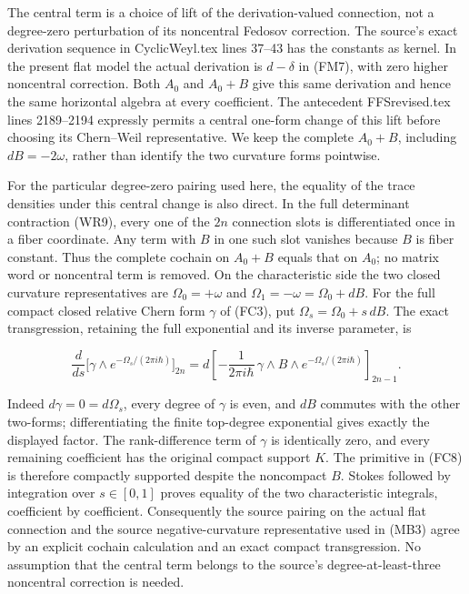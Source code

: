 \documentclass[
  11pt,
]{article}
\begin{document}
The central term is a choice of lift of the derivation-valued
connection, not a degree-zero perturbation of its noncentral Fedosov
correction. The source's exact derivation sequence in CyclicWeyl.tex
lines 37--43 has the constants as kernel. In the present flat model the
actual derivation is \(d-\delta\) in (FM7), with zero higher noncentral
correction. Both \(A_0\) and \(A_0+B\) give this same derivation and
hence the same horizontal algebra at every coefficient. The antecedent
FFSrevised.tex lines 2189--2194 expressly permits a central one-form
change of this lift before choosing its Chern--Weil representative. We
keep the complete \(A_0+B\), including \(dB=-2\omega\), rather than
identify the two curvature forms pointwise.

For the particular degree-zero pairing used here, the equality of the
trace densities under this central change is also direct. In the full
determinant contraction (WR9), every one of the \(2n\) connection slots
is differentiated once in a fiber coordinate. Any term with \(B\) in one
such slot vanishes because \(B\) is fiber constant. Thus the complete
cochain on \(A_0+B\) equals that on \(A_0\); no matrix word or
noncentral term is removed. On the characteristic side the two closed
curvature representatives are \(\Omega_0=+\omega\) and
\(\Omega_1=-\omega=\Omega_0+dB\). For the full compact closed relative
Chern form \(\gamma\) of (FC3), put \(\Omega_s=\Omega_0+s\,dB\). The
exact transgression, retaining the full exponential and its inverse
parameter, is

\[
 \frac{d}{ds}\bigl[\gamma\wedge
     e^{-\Omega_s/(2\pi i\hbar)}\bigr]_{2n}
 =d\left[-\frac{1}{2\pi i\hbar}\,\gamma\wedge B\wedge
     e^{-\Omega_s/(2\pi i\hbar)}\right]_{2n-1}.
 \tag{FC8}
\]

Indeed \(d\gamma=0=d\Omega_s\), every degree of \(\gamma\) is even, and
\(dB\) commutes with the other two-forms; differentiating the finite
top-degree exponential gives exactly the displayed factor. The
rank-difference term of \(\gamma\) is identically zero, and every
remaining coefficient has the original compact support \(K\). The
primitive in (FC8) is therefore compactly supported despite the
noncompact \(B\). Stokes followed by integration over \(s\in[0,1]\)
proves equality of the two characteristic integrals, coefficient by
coefficient. Consequently the source pairing on the actual flat
connection and the source negative-curvature representative used in
(MB3) agree by an explicit cochain calculation and an exact compact
transgression. No assumption that the central term belongs to the
source's degree-at-least-three noncentral correction is needed.
\end{document}
